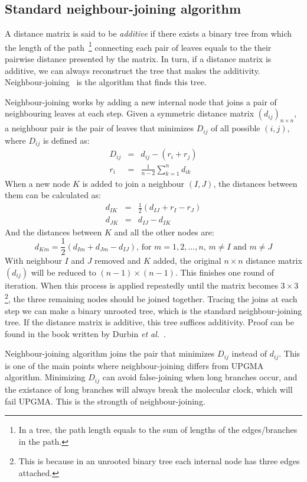 \subsection{Standard neighbour-joining algorithm}
A distance matrix is said to be \emph{additive} if there exists a binary tree from which
the length of the path~\footnote{In a tree, the path length equals to the sum of lengths of the edges/branches in the path.}
connecting each pair of leaves equals to
the their pairwise distance presented by the matrix. In turn, if a distance matrix is additive, we can
always reconstruct the tree that makes the additivity. Neighbour-joining~\cite{saitou87}
is the algorithm that finds this tree.

Neighbour-joining works by adding a new internal node that joins a pair of neighbouring leaves at each step.
Given a symmetric distance matrix $(d_{ij})_{n\times n}$, a neighbour pair is the pair of leaves that minimizes $D_{ij}$ of
all possible $(i,j)$, where $D_{ij}$ is defined as:
\begin{eqnarray*}
D_{ij}&=&d_{ij}-(r_i+r_j) \\
r_i&=&\frac{1}{n-2}\sum_{k=1}^n d_{ik}
\end{eqnarray*}
When a new node $K$ is added to join a neighbour $(I,J)$, the distances between them
can be calculated as:
\begin{eqnarray*}
d_{IK}&=&\frac{1}{2}(d_{IJ}+r_I-r_J) \\
d_{JK}&=&d_{IJ}-d_{IK}
\end{eqnarray*}
And the distances between $K$ and all the other nodes are:
\[
\mbox{$d_{Km}=\frac{1}{2}(d_{Im}+d_{Jm}-d_{IJ})$, for $m=1,2,\ldots,n$, $m\not=I$ and $m\not=J$}
\]
With neighbour $I$ and $J$ removed and $K$ added, the original $n\times n$ distance matrix $(d_{ij})$ will be reduced
to $(n-1)\times(n-1)$. This finishes one round of iteration. When this process is applied
repeatedly until the matrix becomes $3\times3$\footnote{This is because in an unrooted binary tree each internal node
has three edges attached.}, the three remaining nodes should be
joined together. Tracing the joins at each step we can make a binary unrooted tree,
which is the standard neighbour-joining tree.
If the distance matrix is additive, this tree suffices additivity.
Proof can be found in the book written by Durbin {\it et al.}~\cite{durbin98}.

Neighbour-joining algorithm joins the pair that minimizes $D_{ij}$ instead of $d_{ij}$.
This is one of the main points where neighbour-joining differs from UPGMA algorithm.
Minimizing $D_{ij}$ can avoid false-joining when long branches occur, and the existance
of long branches will always break the molecular clock, which will fail UPGMA.
This is the strongth of neighbour-joining.

